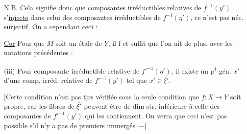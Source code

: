 \uline{N.B.} Cela signifie donc que   composantes irréductibles relatives de $f^{-1}(y')$  s'\uline{injecte} dans celui des composantes irréductibles   de $f^{-1}(\eta')$, ce n'est pas néc. surjectif. On a cependant ceci :

\uline{Cor} Pour que $M$ soit un \uline{} étale de $Y$, il f et suffit que l'on ait de plus, avec les notations précédentes :

(iii)  Pour   composante irréductible relative  de $ {f'}^{-1}(\eta')$, il existe un p\textsuperscript{t} gén. $x'$ d'une comp. irréd. relative de $ {f'}^{-1}(y')$ tel que $x'\in\overline{\xi'}$.

[Cette condition n'est pas tjrs vérifiée sous la seule condition que $f:X\to Y$ soit propre, car  les fibres de $\overline{\xi'}$ peuvent être de dim str. inférieure à celle des composantes de $ {f'}^{-1}(y')$ qui les contiennent. On verra que ceci n'est pas possible s'il n'y a pas de  premiers immergés ---]
